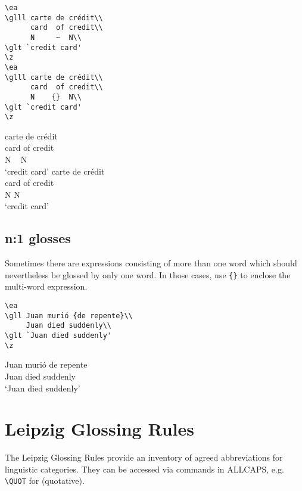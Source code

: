 \documentclass[output=paper]{langscibook}
\newcommand{\cmd}[1]{\texttt{\textbackslash#1}}
\begin{document}
\begin{minipage}{.55\textwidth}
\begin{lstlisting}
\ea
\glll carte de crédit\\ 
      card  of credit\\
      N     ~  N\\
\glt `credit card'     
\z
\ea
\glll carte de crédit\\ 
      card  of credit\\
      N    {}  N\\
\glt `credit card'     
\z
 \end{lstlisting}
\end{minipage}
\parbox{.45\textwidth}{ 
\ea
\glll carte de crédit\\ 
      card  of credit\\
      N     ~  N\\
\glt `credit card'     
\z
\ea
\glll carte de crédit\\ 
      card  of credit\\
      N    {}  N\\
\glt `credit card'     
\z
}


\subsection{n:1 glosses}\label{sec:n1glosses}
Sometimes there are expressions consisting of more than one word which should nevertheless be glossed by only one word. In those cases, use \texttt{\{\}} to enclose the multi-word expression. 


\begin{minipage}{.55\textwidth}
\begin{lstlisting}
\ea
\gll Juan murió {de repente}\\
     Juan died suddenly\\
\glt `Juan died suddenly'     
\z
 \end{lstlisting}
\end{minipage}
\parbox{.45\textwidth}{ 
\ea
\gll Juan murió {de repente}\\
     Juan died suddenly\\
\glt `Juan died suddenly'     
\z
}

\section{Leipzig Glossing Rules}
The Leipzig Glossing Rules provide an inventory of agreed abbreviations for linguistic categories. They can be accessed via commands in ALLCAPS, e.g. \cmd{QUOT} for {\QUOT} (quotative).
 
\end{document}

